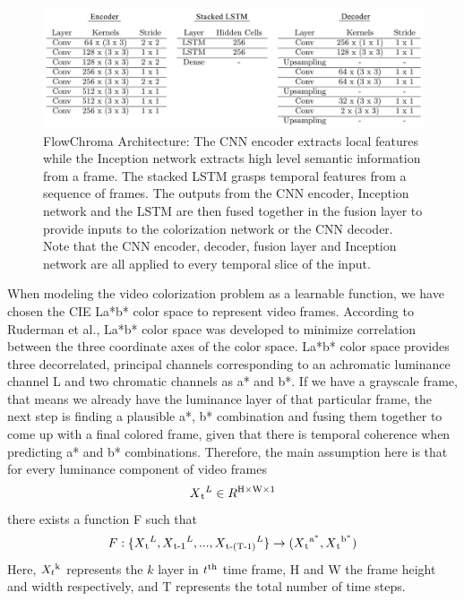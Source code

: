 \documentclass[10pt,twocolumn,letterpaper]{article}
\begin{document}
\begin{figure}
	\includegraphics[width=\textwidth]{kernel-stride-table_1.jpg}
    \caption{FlowChroma Architecture: The CNN encoder extracts local features while the Inception network extracts high level semantic information from a frame. The stacked LSTM grasps temporal features from a sequence of frames. The outputs from the CNN encoder, Inception network and the LSTM are then fused together in the fusion layer to provide inputs to the colorization network or the CNN decoder. Note that the CNN encoder, decoder, fusion layer and Inception network are all applied to every temporal slice of the input.}
\end{figure}

When modeling the video colorization problem as a learnable function, we have chosen the CIE La*b* color space to represent video frames. According to Ruderman et al.\cite{Ruderman98statisticsof}, La*b* color space was developed to minimize correlation between the three coordinate axes of the color space. La*b* color space provides three decorrelated, principal channels corresponding to an achromatic luminance channel L and two chromatic channels as a* and b*. 
If we have a grayscale frame, that means we already have the luminance layer of that particular frame, the next step is finding a plausible a*, b* combination and fusing them together to come up with a final colored frame, given that there is temporal coherence when predicting a* and b* combinations. Therefore, the main assumption here is that for every luminance component of video frames \begin{equation} X\textsubscript{t}^L\in R\textsuperscript{H$\times$W$\times$1} \end{equation} there exists a function F such that \begin{equation}F: \{X\textsubscript{t}^L, X\textsubscript{t-1}^L,..., X\textsubscript{t-(T-1)}^L\} \rightarrow (X\textsubscript{t}\textsuperscript{a$^\ast$}, 
X\textsubscript{t}\textsuperscript{b$^\ast$})\end{equation}  
Here, $X_{t}\textsuperscript{k}$ represents the $k$ layer in $t\textsuperscript{th}$ time frame, H and W the frame height and width respectively, and T represents the total number of time steps.
\end{document}

